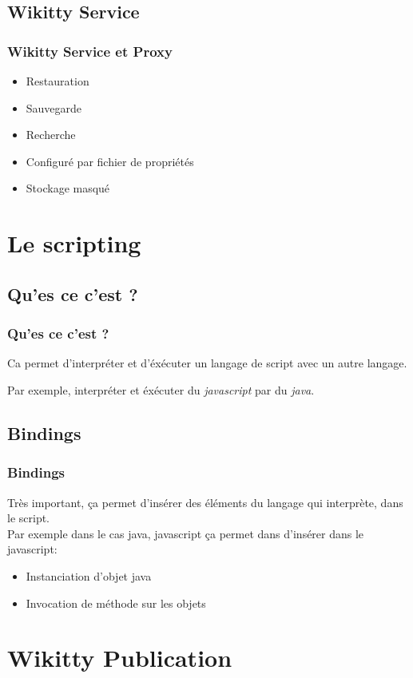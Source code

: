 \documentclass[12pt,a4paper,utf8x]{beamer}
\begin{document}
\subsection*{Wikitty Service}
\begin{frame} \frametitle{Wikitty Service et Proxy} 
\begin{itemize}
\item Restauration 
\item Sauvegarde
\item Recherche
\item Configuré par fichier de propriétés
\item Stockage masqué
\end{itemize}
\end{frame}


\section{Le scripting}
\subsection*{Qu'es ce c'est ?}
\begin{frame}\frametitle{Qu'es ce c'est ?}

Ca permet d'interpréter et d'éxécuter un langage de script avec un autre langage.


\vspace{5mm}
Par exemple, interpréter et éxécuter du \emph{javascript} par du \emph{java}.
\end{frame}
\subsection*{Bindings}
\begin{frame}\frametitle{Bindings}
Très important, ça permet d'insérer des éléments du langage qui interprète, dans le script.\\
\vspace{5mm}
Par exemple dans le cas java, javascript ça permet dans d'insérer dans le javascript:
\begin{itemize}
\item Instanciation d'objet java
\item Invocation de méthode sur les objets
\end{itemize}
\end{frame}


\section{Wikitty Publication} 
\end{document}
